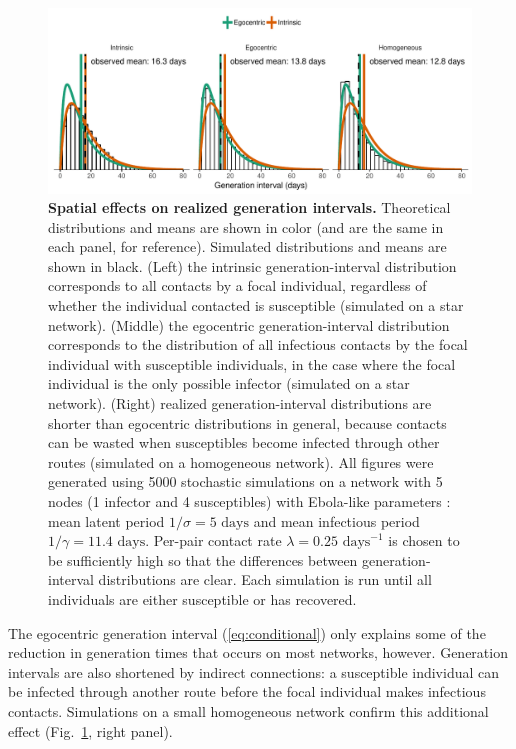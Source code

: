 \documentclass[12pt]{article}
\newcommand{\eref}[1]{(\ref{eq:#1})}
\newcommand{\fref}[1]{Fig.~\ref{fig:#1}}
\begin{document}
\begin{figure}[!pbth]
\includegraphics[width=\textwidth]{../fig/local_effect.pdf}
\caption{
\textbf{Spatial effects on realized generation intervals.}
Theoretical distributions and means are shown in color (and are the same in each panel, for reference). Simulated distributions and means are shown in black.
(Left) the intrinsic generation-interval distribution corresponds to all contacts by a focal individual, regardless of whether the individual contacted is susceptible (simulated on a star network).
(Middle) the egocentric generation-interval distribution corresponds to the distribution of all infectious contacts by the focal individual with susceptible individuals, in the case where the focal individual is the only possible infector (simulated on a star network).
(Right) realized generation-interval distributions are shorter than egocentric distributions in general, because contacts can be wasted when susceptibles become infected through other routes (simulated on a homogeneous network).
All figures were generated using 5000 stochastic simulations on a network with 5 nodes (1 infector and 4 susceptibles) with Ebola-like parameters \citep{who2014ebola}:
mean latent period $1/\sigma = 5 \textrm{ days}$ and mean infectious period $1/\gamma = 11.4 \textrm{ days}$. 
Per-pair contact rate $\lambda = 0.25 \textrm{ days}^{-1}$ is chosen to be sufficiently high so that the differences between generation-interval distributions are clear.
Each simulation is run until all individuals are either susceptible or has recovered.
}
\label{fig:local}
\end{figure}

The egocentric generation interval \eref{conditional} only explains some of the reduction in generation times that occurs on most networks, however.
Generation intervals are also shortened by indirect connections: a susceptible individual can be infected through another route before the focal individual makes infectious contacts.
Simulations on a small homogeneous network confirm this additional effect (\fref{local}, right panel). 
\end{document}
